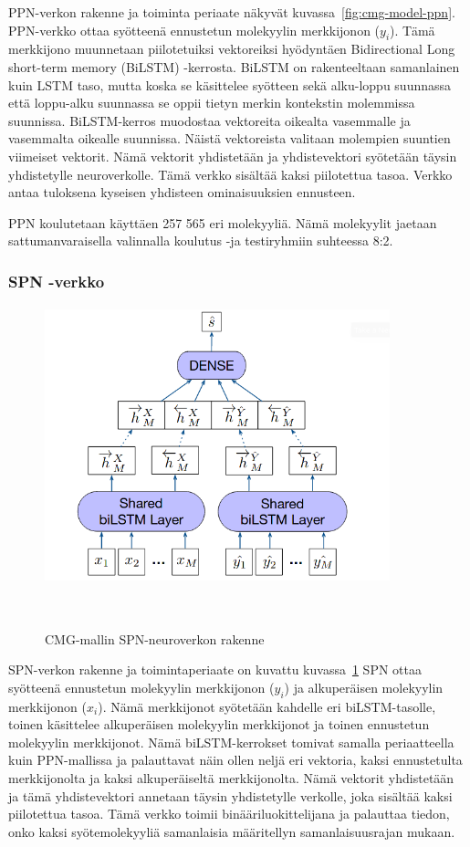 \documentclass[finnish,twoside,censored,tkt,sw-line]{HYthesisML}
\begin{document}
PPN-verkon rakenne ja toiminta periaate näkyvät kuvassa~\ref{fig:cmg-model-ppn}.
PPN-verkko ottaa syötteenä ennustetun molekyylin merkkijonon (\(y_i\)).
Tämä merkkijono muunnetaan piilotetuiksi vektoreiksi hyödyntäen Bidirectional Long short-term memory (BiLSTM) -kerrosta.
BiLSTM on rakenteeltaan samanlainen kuin LSTM taso, mutta koska se käsittelee syötteen sekä alku-loppu suunnassa että loppu-alku suunnassa se oppii tietyn merkin kontekstin molemmissa suunnissa.
BiLSTM-kerros muodostaa vektoreita oikealta vasemmalle ja vasemmalta oikealle suunnissa.
Näistä vektoreista valitaan molempien suuntien viimeiset vektorit.
Nämä vektorit yhdistetään ja yhdistevektori syötetään täysin yhdistetylle neuroverkolle.
Tämä verkko sisältää kaksi piilotettua tasoa.
Verkko antaa tuloksena kyseisen yhdisteen ominaisuuksien ennusteen.

PPN koulutetaan käyttäen 257 565 eri molekyyliä.
Nämä molekyylit jaetaan sattumanvaraisella valinnalla koulutus -ja testiryhmiin suhteessa 8:2.

\subsubsection{SPN -verkko}

\begin{figure}[!ht]
    \centering
    \includegraphics[width=10cm, height=8cm]{cmg-similarity-network.png}
    \caption{CMG-mallin SPN-neuroverkon rakenne}
    {~\cite{ShinBonggun}}
    \label{fig:cmg-model-spn}
\end{figure}

SPN-verkon rakenne ja toimintaperiaate on kuvattu kuvassa~\ref{fig:cmg-model-spn}
SPN ottaa syötteenä ennustetun molekyylin merkkijonon (\(y_i\)) ja alkuperäisen molekyylin merkkijonon (\(x_i\)).
Nämä merkkijonot syötetään kahdelle eri biLSTM-tasolle, toinen käsittelee alkuperäisen molekyylin merkkijonot ja toinen ennustetun molekyylin merkkijonot.
Nämä biLSTM-kerrokset tomivat samalla periaatteella kuin PPN-mallissa ja palauttavat näin ollen neljä eri vektoria, kaksi ennustetulta merkkijonolta ja kaksi alkuperäiseltä merkkijonolta.
Nämä vektorit yhdistetään ja tämä yhdistevektori annetaan täysin yhdistetylle verkolle, joka sisältää kaksi piilotettua tasoa.
Tämä verkko toimii binääriluokittelijana ja palauttaa tiedon, onko kaksi syötemolekyyliä samanlaisia määritellyn samanlaisuusrajan mukaan.
\end{document}
